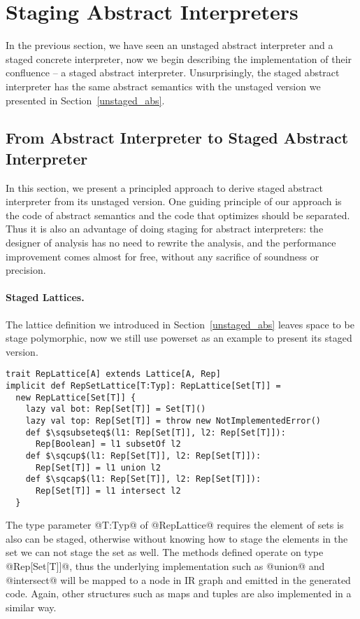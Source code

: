 \section{Staging Abstract Interpreters} \label{sai}

In the previous section, we have seen an unstaged abstract interpreter and a staged concrete interpreter, 
now we begin describing the implementation of their confluence -- a staged abstract interpreter. 
Unsurprisingly, the staged abstract interpreter has the same abstract semantics with the unstaged version
we presented in Section~\ref{unstaged_abs}.

\subsection{From Abstract Interpreter to Staged Abstract Interpreter}

In this section, we present a principled approach to derive staged abstract interpreter
from its unstaged version. One guiding principle of our approach is the code of abstract semantics
and the code that optimizes should be separated. Thus it is also an advantage of doing staging 
for abstract interpreters: the designer of analysis has no need to rewrite the analysis, and 
the performance improvement comes almost for free, without any sacrifice of soundness or precision.

\paragraph{Staged Lattices.} The lattice definition we introduced in Section~\ref{unstaged_abs}
leaves space to be stage polymorphic, now we still use powerset as an example to present its 
staged version. 

\begin{lstlisting}
trait RepLattice[A] extends Lattice[A, Rep]
implicit def RepSetLattice[T:Typ]: RepLattice[Set[T]] = 
  new RepLattice[Set[T]] {
    lazy val bot: Rep[Set[T]] = Set[T]()
    lazy val top: Rep[Set[T]] = throw new NotImplementedError()
    def $\sqsubseteq$(l1: Rep[Set[T]], l2: Rep[Set[T]]): 
      Rep[Boolean] = l1 subsetOf l2
    def $\sqcup$(l1: Rep[Set[T]], l2: Rep[Set[T]]): 
      Rep[Set[T]] = l1 union l2
    def $\sqcap$(l1: Rep[Set[T]], l2: Rep[Set[T]]): 
      Rep[Set[T]] = l1 intersect l2
  }
\end{lstlisting}

The type parameter @T:Typ@ of @RepLattice@ requires the element of sets
is also can be staged, otherwise without knowing how to stage the elements in the set
we can not stage the set as well.
The methods defined operate on type @Rep[Set[T]]@, thus the underlying implementation
such as @union@ and @intersect@ will be mapped to a node in IR graph and emitted in 
the generated code. Again, other structures such as maps and tuples are also implemented
in a similar way.

